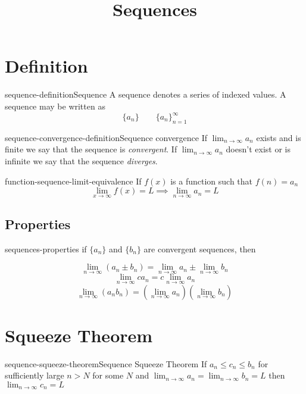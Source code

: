 \documentclass[preview]{standalone}
\begin{document}
\title{Sequences}
\genpage

\section{Definition}

\begin{snippetdefinition}{sequence-definition}{Sequence}{
    A sequence denotes a series of indexed values.
    A sequence may be written as
    \[
        \{a_n\} \quad \quad {\{a_n\}}_{n=1}^\infty
    \]
}
\end{snippetdefinition}

\begin{snippetdefinition}{sequence-convergence-definition}{Sequence convergence}{
    If \(\lim_{n \to \infty}a_n\) exists and is finite
    we say that the sequence is \textit{convergent}. If 
    \(\lim_{n \to \infty}a_n\) doesn't exist or is infinite
    we say that the sequence \textit{diverges}.
}
\end{snippetdefinition}

\begin{snippetcorollary}{function-sequence-limit-equivalence}{}{
    If \(f(x)\) is a function such that \(f(n)=a_n\)
    \[
        \lim_{x\to\infty}f(x)=L \implies
        \lim_{n\to\infty}a_n=L
    \]
}
\end{snippetcorollary}

\subsection{Properties}

\begin{snippet}{sequences-properties}
if \(\{a_n\}\) and \(\{b_n\}\) are convergent sequences, then

\[
    \lim_{n\to\infty} (a_n \pm b_n) = \lim_{n\to\infty} a_n \pm
    \lim_{n\to\infty} b_n
\]
\[
    \lim_{n\to\infty} ca_n = c \lim_{n\to\infty} a_n
\]
\[
    \lim_{n\to\infty} (a_n b_n) =
    \left(\lim_{n\to\infty} a_n\right)
    \left(\lim_{n\to\infty} b_n\right)
\]
\end{snippet}

\section{Squeeze Theorem}

\begin{snippettheorem}{sequence-squeeze-theorem}{Sequence Squeeze Theorem}{
    If \(a_n \leq c_n \leq b_n\) for sufficiently large \(n>N\) for some \(N\)
    and \(\lim_{n\to\infty}a_n =\lim_{n\to\infty}b_n=L\)
    then \(\lim_{n\to\infty} c_n =L\)
}
\end{snippettheorem}
\end{document}
